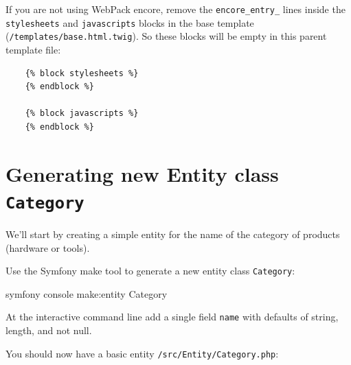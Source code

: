 \documentclass[a4paperpaper,openright]{book}
\newenvironment{Shaded}{}{}
\newcommand{\CommentTok}[1]{\textcolor[rgb]{0.38,0.63,0.69}{\textit{#1}}}
\newcommand{\ExtensionTok}[1]{#1}
\newcommand{\KeywordTok}[1]{\textcolor[rgb]{0.00,0.44,0.13}{\textbf{#1}}}
\newcommand{\NormalTok}[1]{#1}
\newcommand{\OtherTok}[1]{\textcolor[rgb]{0.00,0.44,0.13}{#1}}
\newcommand{\StringTok}[1]{\textcolor[rgb]{0.25,0.44,0.63}{#1}}
\begin{document}
If you are not using WebPack encore, remove the \texttt{encore\_entry\_}
lines inside the \texttt{stylesheets} and \texttt{javascripts} blocks in
the base template (\texttt{/templates/base.html.twig}). So these blocks
will be empty in this parent template file:

\begin{verbatim}
    {% block stylesheets %}
    {% endblock %}

    {% block javascripts %}
    {% endblock %}
\end{verbatim}

\hypertarget{generating-new-entity-class-category}{%
\section{\texorpdfstring{Generating new Entity class
\texttt{Category}}{Generating new Entity class Category}}\label{generating-new-entity-class-category}}

We'll start by creating a simple entity for the name of the category of
products (hardware or tools).

Use the Symfony make tool to generate a new entity class
\texttt{Category}:

\begin{Shaded}
\begin{Highlighting}[]
     \ExtensionTok{symfony}\NormalTok{ console make:entity Category}
\end{Highlighting}
\end{Shaded}

At the interactive command line add a single field \texttt{name} with
defaults of string, length, and not null.

You should now have a basic entity \texttt{/src/Entity/Category.php}:

\begin{Shaded}
\end{Shaded}
\end{document}
